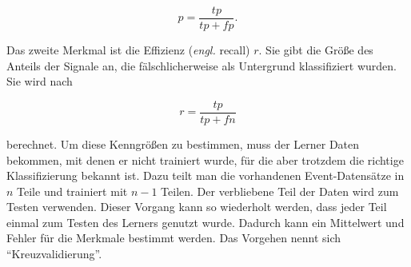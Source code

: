 \begin{equation}
	p=\frac{tp}{tp+fp}.
\end{equation}

Das zweite Merkmal ist die Effizienz (\textit{engl.} recall) $r$. Sie gibt die Größe des Anteils der Signale an, die fälschlicherweise als Untergrund klassifiziert wurden. Sie wird nach

\begin{equation}
	r=\frac{tp}{tp+fn}
\end{equation}

berechnet. Um diese Kenngrößen zu bestimmen, muss der Lerner Daten bekommen, mit denen er nicht trainiert wurde, für die aber trotzdem die richtige Klassifizierung bekannt
ist. Dazu teilt man die vorhandenen Event-Datensätze in $n$ Teile und trainiert mit $n-1$ Teilen. Der verbliebene Teil der Daten wird zum Testen verwenden. Dieser Vorgang
kann so wiederholt werden, dass jeder Teil einmal zum Testen des Lerners genutzt wurde. Dadurch kann ein Mittelwert und Fehler für die Merkmale bestimmt werden. Das Vorgehen nennt sich \enquote{Kreuzvalidierung}.